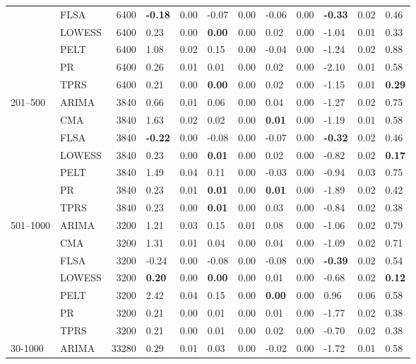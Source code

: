 \begin{table}[ht]
\begin{tabular}{llrlrlrlrlrl}
   & FLSA & 6400 & \textbf{-0.18} & 0.00 & -0.07 & 0.00 & -0.06 & 0.00 & \textbf{-0.33} & 0.02 & 0.46 \\ 
   & LOWESS & 6400 & 0.23 & 0.00 & \textbf{0.00} & 0.00 & 0.02 & 0.00 & -1.04 & 0.01 & 0.33 \\ 
   & PELT & 6400 & 1.08 & 0.02 & 0.15 & 0.00 & -0.04 & 0.00 & -1.24 & 0.02 & 0.88 \\ 
   & PR & 6400 & 0.26 & 0.01 & 0.01 & 0.00 & 0.02 & 0.00 & -2.10 & 0.01 & 0.58 \\ 
   & TPRS & 6400 & 0.21 & 0.00 & \textbf{0.00} & 0.00 & 0.02 & 0.00 & -1.15 & 0.01 & \textbf{0.29} \\ 
  201–500 & ARIMA & 3840 & 0.66 & 0.01 & 0.06 & 0.00 & 0.04 & 0.00 & -1.27 & 0.02 & 0.75 \\ 
   & CMA & 3840 & 1.63 & 0.02 & 0.02 & 0.00 & \textbf{0.01} & 0.00 & -1.19 & 0.01 & 0.58 \\ 
   & FLSA & 3840 & \textbf{-0.22} & 0.00 & -0.08 & 0.00 & -0.07 & 0.00 & \textbf{-0.32} & 0.02 & 0.46 \\ 
   & LOWESS & 3840 & 0.23 & 0.00 & \textbf{0.01} & 0.00 & 0.02 & 0.00 & -0.82 & 0.02 & \textbf{0.17} \\ 
   & PELT & 3840 & 1.49 & 0.04 & 0.11 & 0.00 & -0.03 & 0.00 & -0.94 & 0.03 & 0.75 \\ 
   & PR & 3840 & 0.23 & 0.01 & \textbf{0.01} & 0.00 & \textbf{0.01} & 0.00 & -1.89 & 0.02 & 0.42 \\ 
   & TPRS & 3840 & 0.23 & 0.00 & \textbf{0.01} & 0.00 & 0.03 & 0.00 & -0.84 & 0.02 & 0.38 \\ 
  501–1000 & ARIMA & 3200 & 1.21 & 0.03 & 0.15 & 0.01 & 0.08 & 0.00 & -1.06 & 0.02 & 0.79 \\ 
   & CMA & 3200 & 1.31 & 0.01 & 0.04 & 0.00 & 0.04 & 0.00 & -1.09 & 0.02 & 0.71 \\ 
   & FLSA & 3200 & -0.24 & 0.00 & -0.08 & 0.00 & -0.08 & 0.00 & \textbf{-0.39} & 0.02 & 0.54 \\ 
   & LOWESS & 3200 & \textbf{0.20} & 0.00 & \textbf{0.00} & 0.00 & 0.01 & 0.00 & -0.68 & 0.02 & \textbf{0.12} \\ 
   & PELT & 3200 & 2.42 & 0.04 & 0.15 & 0.00 & \textbf{0.00} & 0.00 & 0.96 & 0.06 & 0.58 \\ 
   & PR & 3200 & 0.21 & 0.00 & 0.01 & 0.00 & 0.01 & 0.00 & -1.77 & 0.02 & 0.38 \\ 
   & TPRS & 3200 & 0.21 & 0.00 & 0.01 & 0.00 & 0.02 & 0.00 & -0.70 & 0.02 & 0.38 \\ 
  30-1000 & ARIMA & 33280 & 0.29 & 0.01 & 0.03 & 0.00 & -0.02 & 0.00 & -1.72 & 0.01 & 0.58 \\ 

\end{tabular}
\end{table}
